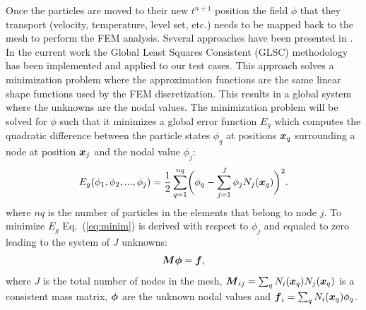 Once the particles are moved to their new $t^{n+1}$ position the field $\phi$ that they transport (velocity, temperature, level set, etc.) needs to be mapped back to the mesh to perform the FEM analysis. Several approaches have been presented in \cite{gimenez:tesis}. In the current work the Global Least Squares Consistent (GLSC) methodology has been implemented and applied to our test cases. This approach solves a minimization problem where the approximation functions are the same linear shape functions used by the FEM discretization. This results in a global system where the unknowns are the nodal values. The minimization problem will be solved for $\phi$ such that it minimizes a global error function $E_g$ which computes the quadratic difference between the particle states $\phi_q$ at positions $\boldsymbol{x}_q$ surrounding a node at position $\boldsymbol{x}_j$ and the nodal value $\phi_j$:
%
\begin{equation}\label{eq:minim}
  E_g(\phi_1,\phi_2,...,\phi_j)=\frac{1}{2}\sum_{q=1}^{nq} \biggl(\phi_q-\sum_{j=1}^J\phi_jN_j(\boldsymbol{x}_q)\biggr)^2.
\end{equation}
where $nq$ is the number of particles in the elements that belong to node $j$.
%
To minimize $E_g$ Eq.~(\ref{eq:minim}) is derived with respect to $\phi_j$ and equaled to zero leading to the system of $J$ unknowns:
%
\begin{equation}\label{eq:mapptom}
  \boldsymbol{M}\boldsymbol{\phi}=\boldsymbol{f},
\end{equation}
%
where $J$ is the total number of nodes in the mesh, $\boldsymbol{M}_{ij}=\sum_qN_i(\boldsymbol{x}_q)N_j(\boldsymbol{x}_q)$ is a consistent mass matrix, $\boldsymbol{\phi}$ are the unknown nodal values and $\boldsymbol{f}_i=\sum_qN_i(\boldsymbol{x}_q)\phi_q$.

